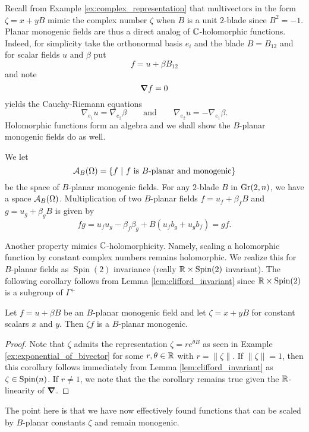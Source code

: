 
Recall from Example \ref{ex:complex_representation} that multivectors in the form $\zeta=x+yB$ mimic the complex number $\zeta$ when $B$ is a unit $2$-blade since $B^2=-1$.  Planar monogenic fields are thus a direct analog of $\mathbb{C}$-holomorphic functions.  Indeed, for simplicity take the orthonormal basis $e_i$ and the blade $B=B_{12}$ and for scalar fields $u$ and $\beta$ put
\[
f=u+\beta B_{12}
\]
and note
\[
\boldsymbol{\nabla} f = 0 
\]
yields the Cauchy-Riemann equations
\[
\nabla_{e_1} u = \nabla_{e_2} \beta \qquad \textrm{and} \qquad \nabla_{e_2}u = -\nabla_{e_1} \beta.
\]
Holomorphic functions form an algebra and we shall show the $B$-planar monogenic fields do as well. 

We let 
\[
\mathcal{A}_{B}(\Omega) = \{f ~\vert~ \textrm{$f$ is $B$-planar and monogenic}\}
\]
be the space of $B$-planar monogenic fields. For any $2$-blade $B$ in $\operatorname{Gr}(2,n)$, we have a space $\mathcal{A}_{B}(\Omega)$. Multiplication of two $B$-planar fields $f=u_f+\beta_f B$ and $g=u_g+\beta_g B$ is given by
\begin{equation}
\label{eq:axial_multiplication}
fg = u_f u_g - \beta_f \beta_g + B (u_f b_g + u_g b_f) = gf.
\end{equation}

Another property mimics $\mathbb{C}$-holomorphicity.  Namely, scaling a holomorphic function by constant complex numbers remains holomorphic. We realize this for $B$-planar fields as $\operatorname{Spin}(2)$ invariance (really $\mathbb{R} \times \operatorname{Spin}(2)$ invariant).  The following corollary follows from Lemma \ref{lem:clifford_invariant} since $\mathbb{R} \times \operatorname{Spin}(2)$ is a subgroup of $\Gamma^+$ 
\begin{corollary}
    \label{cor:mult_by_i_monogenic}
    Let $f=u+\beta B$ be an $B$-planar monogenic field and let $\zeta=x+yB$ for constant scalars $x$ and $y$. Then $\zeta f$ is a $B$-planar monogenic.
\end{corollary}
\begin{proof}
    Note that $\zeta$ admits the representation $\zeta = re^{\theta B}$ as seen in Example \ref{ex:exponential_of_bivector} for some $r,\theta \in \mathbb{R}$ with $r= \|\zeta\|$. If $\|\zeta\|=1$, then this corollary follows immediately from Lemma \ref{lem:clifford_invariant} as $\zeta \in \operatorname{Spin}(n)$. If $r\neq 1$, we note that the the corollary remains true given the $\mathbb{R}$-linearity of $\boldsymbol{\nabla}$.
\end{proof}
The point here is that we have now effectively found functions that can be scaled by $B$-planar constants $\zeta$ and remain monogenic. 
 
